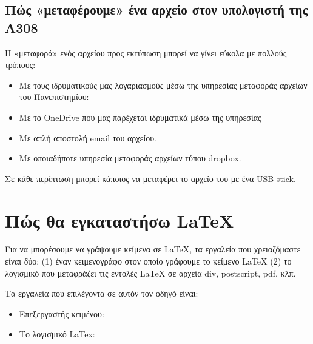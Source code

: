 \documentclass[letterpaper,10pt,greek]{sphinxhowto}
\begin{document}
\subsection{Πώς «μεταφέρουμε» ένα αρχείο στον υπολογιστή της Α308}
\label{\detokenize{HowToPrint:id4}}
\sphinxAtStartPar
Η «μεταφορά» ενός αρχείου προς εκτύπωση μπορεί να γίνει εύκολα με πολλούς τρόπους:
\begin{itemize}
\item {} 
\sphinxAtStartPar
Με τους ιδρυματικούς μας λογαριασμούς μέσω της υπηρεσίας μεταφοράς αρχείων του Πανεπιστημίου: 

\item {} 
\sphinxAtStartPar
Με το OneDrive που μας παρέχεται ιδρυματικά μέσω της υπηρεσίας 

\item {} 
\sphinxAtStartPar
Με απλή αποστολή email του αρχείου.

\item {} 
\sphinxAtStartPar
Με οποιαδήποτε υπηρεσία μεταφοράς αρχείων τύπου dropbox.

\end{itemize}

\sphinxAtStartPar
Σε κάθε περίπτωση μπορεί κάποιος να μεταφέρει το αρχείο του με ένα USB stick.

\sphinxstepscope


\section{Πώς θα εγκαταστήσω LaTeX}
\label{\detokenize{HowToInstallLaTeX:latex}}\label{\detokenize{HowToInstallLaTeX::doc}}
\sphinxAtStartPar
Για να μπορέσουμε να γράψουμε κείμενα σε LaTeΧ, τα εργαλεία που
χρειαζόμαστε είναι δύο: (1) έναν κειμενογράφο
στον οποίο γράφουμε το κείμενο LaTeX (2) το λογισμικό που μεταφράζει τις εντολές
LaTeX σε αρχεία div, postscript, pdf, κλπ.

\sphinxAtStartPar
Τα εργαλεία που επιλέγοντα σε αυτόν τον οδηγό είναι:
\begin{itemize}
\item {} 
\sphinxAtStartPar
Επεξεργαστής κειμένου: 

\item {} 
\sphinxAtStartPar
Το λογισμικό LaTex: 

\end{itemize}
\end{document}
